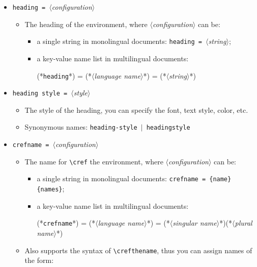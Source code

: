 \documentclass[classical]{einfart}
\providecommand{\meta}[1]{$\langle${\normalfont\itshape#1}$\rangle$}
\newcommand{\commandoption}[1]{\texttt{\textcolor{black!67!cyan}{#1}}}
\begin{document}
\begin{itemize}
    \item \commandoption{heading}\lstinline| = |\meta{configuration}
        \begin{itemize}
            \item The heading of the environment, where \meta{configuration} can be:
            \begin{itemize}
                \item a single string in monolingual documents: \commandoption{heading}\lstinline| = |\meta{string};
                \item a key-value name list in multilingual documents:
\begin{code}
(*\commandoption{heading}*) = {
    (*\meta{language name}*) = (*\meta{string}*)
}
\end{code}
            \end{itemize}
        \end{itemize}
    \item \commandoption{heading style}\lstinline| = |\meta{style}
        \begin{itemize}
            \item The style of the heading, you can specify the font, text style, color, etc.
            \item Synonymous names: \commandoption{heading-style} \,$|$\, \commandoption{headingstyle}
        \end{itemize}
    \item \commandoption{crefname}\lstinline| = |\meta{configuration}
        \begin{itemize}
            \item The name for \lstinline|\cref| the environment, where \meta{configuration} can be:
            \begin{itemize}
                \item a single string in monolingual documents: \commandoption{crefname}\lstinline| = {name}{names}|;
                \item a key-value name list in multilingual documents:
\begin{code}
(*\commandoption{crefname}*) = {
    (*\meta{language name}*) = {(*\meta{singular name}*)}{(*\meta{plural name}*)}
}
\end{code}
            \end{itemize}
            \item Also supports the syntax of \lstinline|\crefthename|, thus you can assign names of the form:

\end{itemize}
\end{itemize}
\end{document}

